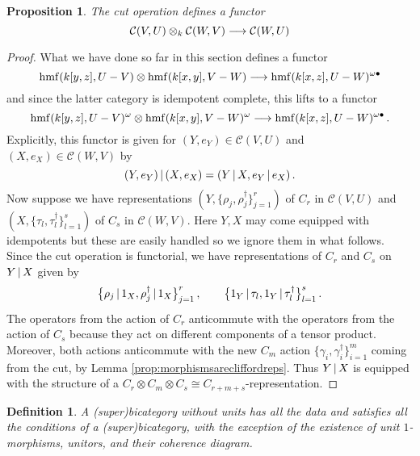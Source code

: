 \documentclass[english,letter paper,12pt,leqno]{article}
\newtheorem{proposition}[theorem]{Proposition}
\theoremstyle{example}
\newtheorem{definition}[theorem]{Definition}
\numberwithin{equation}{section}
\def\be{\begin{equation}}
\def\ee{\end{equation}}
\def\L{\mathcal{C}}
\def\ferm{\gamma}
\def\fermc{\gamma^\dagger}
\DeclareMathOperator{\hmf}{hmf}
\begin{document}
\begin{proposition}\label{prop:cutisafunctor} The cut operation defines a functor
\be\label{eq:cutisafunctor}
\L(V,U) \otimes_k \L(W,V) \lto \L(W, U)
\ee
\end{proposition}
\begin{proof}
What we have done so far in this section defines a functor
\[
\hmf( k[y,z], U - V ) \otimes \hmf( k[x,y], V - W ) \lto \hmf( k[x,z], U - W )^{\omega \bullet}
\]
and since the latter category is idempotent complete, this lifts to a functor
\[
\hmf( k[y,z], U - V )^{\omega} \otimes \hmf( k[x,y], V - W )^{\omega} \lto \hmf( k[x,z], U - W )^{\omega \bullet}\,.
\]
Explicitly, this functor is given for $(Y,e_Y) \in \L(V,U)$ and $(X,e_X) \in \L(W,V)$ by
\[
(Y, e_Y) \,|\, (X, e_X) = (Y \,|\, X, e_Y \,|\, e_X)\,.
\]
Now suppose we have representations $( Y, \{ \rho_j, \rho_j^\dagger \}_{j=1}^r )$ of $C_r$ in $\L(V,U)$ and $( X, \{ \tau_l, \tau^\dagger_l \}_{l=1}^s )$ of $C_s$ in $\L(W,V)$. Here $Y,X$ may come equipped with idempotents but these are easily handled so we ignore them in what follows. Since the cut operation is functorial, we have representations of $C_r$ and $C_s$ on $Y \,|\, X$ given by
\[
\big\{ \rho_j \,|\, 1_X, \rho_j^\dagger \,|\, 1_X \big\}_{j=1}^r\,, \qquad \big\{ 1_Y \,|\, \tau_l, 1_Y \,|\, \tau_l^\dagger \big\}_{l=1}^s\,.
\]
The operators from the action of $C_r$ anticommute with the operators from the action of $C_s$ because they act on different components of a tensor product. Moreover, both actions anticommute with the new $C_m$ action $\{ \ferm_i, \fermc_i \}_{i=1}^m$ coming from the cut, by Lemma \ref{prop:morphismsarecliffordreps}. Thus $Y \,|\, X$ is equipped with the structure of a $C_r \otimes C_m \otimes C_s \cong C_{r+m+s}$-representation.
\end{proof}


\begin{definition} A \textsl{(super)bicategory without units} has all the data and satisfies all the conditions of a (super)bicategory, with the exception of the existence of unit $1$-morphisms, unitors, and their coherence diagram.
\end{definition}
\end{document}
